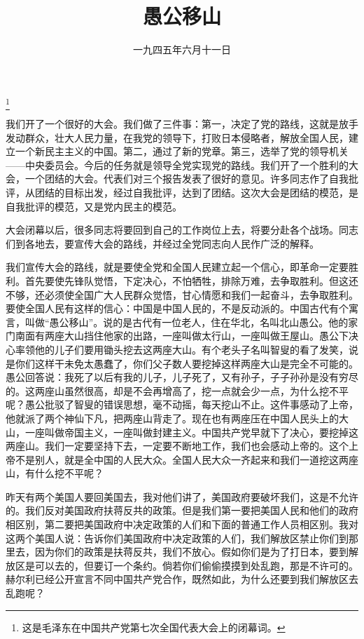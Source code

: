 
\title{愚公移山}
\date{一九四五年六月十一日}
\thanks{这是毛泽东在中国共产党第七次全国代表大会上的闭幕词。}
\maketitle


我们开了一个很好的大会。我们做了三件事：第一，决定了党的路线，这就是放手发动群众，壮大人民力量，在我党的领导下，打败日本侵略者，解放全国人民，建立一个新民主主义的中国。第二，通过了新的党章。第三，选举了党的领导机关——中央委员会。今后的任务就是领导全党实现党的路线。我们开了一个胜利的大会，一个团结的大会。代表们对三个报告发表了很好的意见。许多同志作了自我批评，从团结的目标出发，经过自我批评，达到了团结。这次大会是团结的模范，是自我批评的模范，又是党内民主的模范。

大会闭幕以后，很多同志将要回到自己的工作岗位上去，将要分赴各个战场。同志们到各地去，要宣传大会的路线，并经过全党同志向人民作广泛的解释。

我们宣传大会的路线，就是要使全党和全国人民建立起一个信心，即革命一定要胜利。首先要使先锋队觉悟，下定决心，不怕牺牲，排除万难，去争取胜利。但这还不够，还必须使全国广大人民群众觉悟，甘心情愿和我们一起奋斗，去争取胜利。要使全国人民有这样的信心：中国是中国人民的，不是反动派的。中国古代有个寓言，叫做“愚公移山”。说的是古代有一位老人，住在华北，名叫北山愚公。他的家门南面有两座大山挡住他家的出路，一座叫做太行山，一座叫做王屋山。愚公下决心率领他的儿子们要用锄头挖去这两座大山。有个老头子名叫智叟的看了发笑，说是你们这样干未免太愚蠢了，你们父子数人要挖掉这样两座大山是完全不可能的。愚公回答说：我死了以后有我的儿子，儿子死了，又有孙子，子子孙孙是没有穷尽的。这两座山虽然很高，却是不会再增高了，挖一点就会少一点，为什么挖不平呢？愚公批驳了智叟的错误思想，毫不动摇，每天挖山不止。这件事感动了上帝，他就派了两个神仙下凡，把两座山背走了。现在也有两座压在中国人民头上的大山，一座叫做帝国主义，一座叫做封建主义。中国共产党早就下了决心，要挖掉这两座山。我们一定要坚持下去，一定要不断地工作，我们也会感动上帝的。这个上帝不是别人，就是全中国的人民大众。全国人民大众一齐起来和我们一道挖这两座山，有什么挖不平呢？

昨天有两个美国人要回美国去，我对他们讲了，美国政府要破坏我们，这是不允许的。我们反对美国政府扶蒋反共的政策。但是我们第一要把美国人民和他们的政府相区别，第二要把美国政府中决定政策的人们和下面的普通工作人员相区别。我对这两个美国人说：告诉你们美国政府中决定政策的人们，我们解放区禁止你们到那里去，因为你们的政策是扶蒋反共，我们不放心。假如你们是为了打日本，要到解放区是可以去的，但要订一个条约。倘若你们偷偷摸摸到处乱跑，那是不许可的。赫尔利已经公开宣言不同中国共产党合作，既然如此，为什么还要到我们解放区去乱跑呢？


